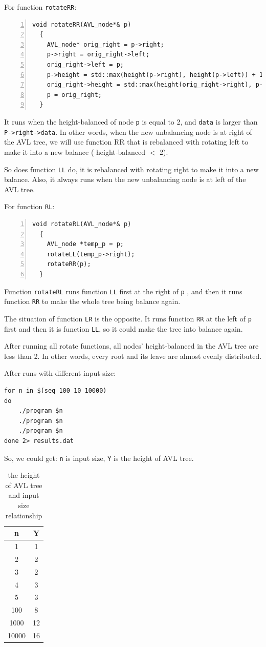 \documentclass[11pt]{article}
\begin{document}
For function \texttt{rotateRR}:
\begin{Verbatim}[numbers=left,xleftmargin=5mm]
void rotateRR(AVL_node*& p)
  {
    AVL_node* orig_right = p->right;
    p->right = orig_right->left;
    orig_right->left = p;
    p->height = std::max(height(p->right), height(p->left)) + 1;
    orig_right->height = std::max(height(orig_right->right), p->height) + 1;
    p = orig_right;
  }
\end{Verbatim}
It runs when the height-balanced of node \texttt{p} is equal to 2, and \texttt{data}
is larger than \texttt{P->right->data}. In other words, when the new unbalancing node 
is at right of the AVL tree, we will use function RR that is rebalanced with 
rotating left to make it into a new balance ( height-balanced $<$ 2). 

So does function \texttt{LL} do, it is rebalanced with rotating right to make it into
a new balance. Also, it always runs when the new unbalancing node is at left of 
the AVL tree.

For function \texttt{RL}:
\begin{Verbatim}[numbers=left,xleftmargin=5mm]
void rotateRL(AVL_node*& p)
  {
    AVL_node *temp_p = p;
    rotateLL(temp_p->right);
    rotateRR(p);
  }
\end{Verbatim}
Function \texttt{rotateRL} runs function \texttt{LL} first at the right of \texttt{p}
, and then it runs function \texttt{RR} to make the whole tree being balance again. 

The situation of function \texttt{LR} is the opposite. It runs function \texttt{RR} at 
the left of \texttt{p} first and then it is function \texttt{LL}, so it could make 
the tree into balance again. 

After running all rotate functions, all nodes' height-balanced in the AVL tree are less 
than 2. In other words, every root and its leave are almost evenly distributed.

After runs with different input size:
\begin{Verbatim}
for n in $(seq 100 10 10000)
do
    ./program $n
    ./program $n
    ./program $n
done 2> results.dat
\end{Verbatim}

So, we could get:
\texttt{n} is input size, \texttt{Y} is the height of AVL tree.
\begin{table}[htbp]
    \centering
    \begin{tabular}{c|c}
        n & Y \\
    \hline
        1 & 1  \\
        2 & 2  \\
        3 & 2  \\
        4 & 3  \\
        5 & 3  \\
      100 & 8  \\
     1000 & 12  \\
    10000 & 16  \\ 
    \end{tabular}
    \caption{the height of AVL tree and input size relationship}
    \label{sum&n}
\end{table}
\end{document}
